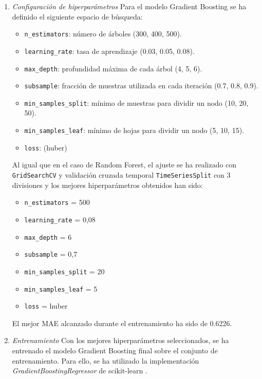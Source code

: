 \begin{enumerate}
    \item \emph{Configuración de hiperparámetros}
    Para el modelo Gradient Boosting se ha definido el siguiente espacio de búsqueda:

    \begin{itemize}
        \item \texttt{n\_estimators}: número de árboles (300, 400, 500).
        \item \texttt{learning\_rate}: tasa de aprendizaje (0.03, 0.05, 0.08).
        \item \texttt{max\_depth}: profundidad máxima de cada árbol (4, 5, 6).
        \item \texttt{subsample}: fracción de muestras utilizada en cada iteración (0.7, 0.8, 0.9).
        \item \texttt{min\_samples\_split}: mínimo de muestras para dividir un nodo (10, 20, 50).
        \item \texttt{min\_samples\_leaf}: mínimo de hojas para dividir un nodo (5, 10, 15).
        \item \texttt{loss}: (huber)
    \end{itemize}

    Al igual que en el caso de Random Forest, el ajuste se ha realizado con \texttt{GridSearchCV} y validación cruzada temporal \texttt{TimeSeriesSplit} con 3 divisiones y los mejores hiperparámetros obtenidos han sido:

    \begin{itemize}
        \item \texttt{n\_estimators} = 500
        \item \texttt{learning\_rate} = 0,08
        \item \texttt{max\_depth} = 6
        \item \texttt{subsample} = 0,7
        \item \texttt{min\_samples\_split} = 20
        \item \texttt{min\_samples\_leaf} = 5
        \item \texttt{loss} = huber
    \end{itemize}

    El mejor MAE alcanzado durante el entrenamiento ha sido de 0.6226.

    \item \emph{Entrenamiento}
    Con los mejores hiperparámetros seleccionados, se ha entrenado el modelo Gradient Boosting final sobre el conjunto de entrenamiento. Para ello, se ha utilizado la implementación \textit{GradientBoostingRegressor} de scikit-learn \cite{scikit_gb}.


\end{enumerate}
